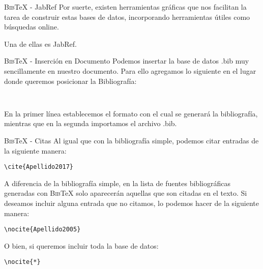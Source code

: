 \documentclass[11pt]{beamer}
\newcommand{\BibTeX}{\textsc{Bib}\TeX{}}
\begin{document}
\begin{frame}{\BibTeX{} - JabRef}
Por suerte, existen herramientas gráficas que nos facilitan la tarea de construir estas bases de datos, incorporando herramientas útiles como búsquedas online.

Una de ellas es JabRef.

\end{frame}


\begin{frame}[fragile]{\BibTeX{} - Inserción en Documento}
Podemos insertar la base de datos .bib muy sencillamente en nuestro documento. Para ello agregamos lo siguiente en el lugar donde queremos posicionar la Bibliografía:

{\color{new_green} \scriptsize
\begin{verbatim}


\end{verbatim}
}

En la primer línea establecemos el formato con el cual se generará la bibliografía, mientras que en la segunda importamos el archivo .bib.
\end{frame}

\begin{frame}[fragile]{\BibTeX{} - Citas}
Al igual que con la bibliografía simple, podemos citar entradas de la siguiente manera:

{\color{new_green} \scriptsize
\begin{verbatim}
\cite{Apellido2017}
\end{verbatim}
}

A diferencia de la bibliografía simple, en la lista de fuentes bibliográficas generadas con \BibTeX{} solo aparecerán aquellas que son citadas en el texto. Si deseamos incluir alguna entrada que no citamos, lo podemos hacer de la siguiente manera:

{\color{new_green} \scriptsize
\begin{verbatim}
\nocite{Apellido2005}
\end{verbatim}
}

O bien, si queremos incluir toda la base de datos:

{\color{new_green} \scriptsize
\begin{verbatim}
\nocite{*}
\end{verbatim}
}
\end{frame}
\end{document}
